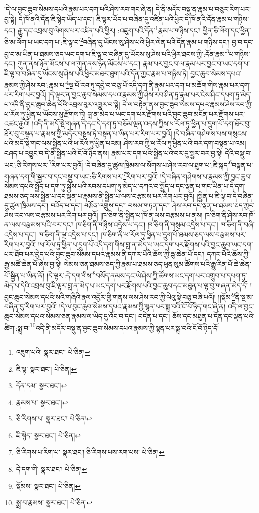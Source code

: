 །དེ་ལ་བྱང་ཆུབ་སེམས་དཔའི་རྣམ་པར་དག་པའི་ཤེས་རབ་གང་ཞེ་ན། དེ་ནི་མདོར་བསྡུ་ན་རྣམ་པ་བཅུར་རིག་པར་བྱ་སྟེ། དེ་ཁོ་ནའི་དོན་ཇི་སྙེད་ཡོད་པ་དང་། ཇི་ལྟར་ཡོད་པ་བཞིན་དུ་འཛིན་པའི་ཕྱིར་དེ་ཁོ་ནའི་དོན་རྣམ་པ་གཉིས་དང་། རྒྱུ་དང་འབྲས་བུ་ལེགས་པར་འཛིན་པའི་ཕྱིར། :འཇུག་པའི་དོན་\footnote{འཇུག་པའི་  སྣར་ཐང་།  པེ་ཅིན། }རྣམ་པ་གཉིས་དང་། ཕྱིན་ཅི་ལོག་དང་ཕྱིན་ཅི་མ་ལོག་པ་ཡང་དག་པ་:ཇི་ལྟ་བ་\footnote{ཇི་ལྟ་  སྣར་ཐང་།  པེ་ཅིན། }བཞིན་དུ་ཡོངས་སུ་ཤེས་པའི་ཕྱིར་ལེན་པའི་དོན་རྣམ་པ་གཉིས་དང་། བྱ་བ་དང་བྱ་བ་མ་ཡིན་པ་ཐམས་ཅད་ཡང་དག་པ་ཇི་ལྟ་བ་བཞིན་དུ་ཡོངས་སུ་ཤེས་པའི་ཕྱིར་ཐབས་ཀྱི་:དོན་རྣམ་\footnote{དོན་དམ་  སྣར་ཐང་། }པ་གཉིས་དང་། ཀུན་ནས་ཉོན་མོངས་པ་ལ་ཀུན་ནས་ཉོན་མོངས་པ་དང་། རྣམ་པར་བྱང་བ་ལ་རྣམ་པར་བྱང་བ་ཡང་དག་པ་ཇི་ལྟ་བ་བཞིན་དུ་ཡོངས་སུ་ཤེས་པའི་ཕྱིར་མཐར་ཐུག་པའི་དོན་ཀྱང་རྣམ་པ་གཉིས་ཏེ། བྱང་ཆུབ་སེམས་དཔའ་རྣམས་ཀྱི་ཤེས་རབ་:རྣམ་པ་\footnote{རྣམས་པ་  སྣར་ཐང་། }ལྔ་པོ་རབ་ཏུ་དབྱེ་བ་བཅུ་པོ་འདི་དག་ནི་རྣམ་པར་དག་པ་མཆོག་གིས་རྣམ་པར་དག་པར་རིག་པར་བྱའོ། །དེ་ལྟར་ན་བྱང་ཆུབ་སེམས་དཔའ་རྣམས་ཀྱི་ཤེས་རབ་ཤིན་ཏུ་རྣམ་པར་ངེས་ཤིང་དཔག་ཏུ་མེད་པ་འདི་ནི་བྱང་ཆུབ་ཆེན་པོའི་འབྲས་བུར་འགྱུར་བ་སྟེ། དེ་ལ་བརྟེན་ནས་བྱང་ཆུབ་སེམས་དཔའ་རྣམས་ཤེས་རབ་ཀྱི་ཕ་རོལ་ཏུ་ཕྱིན་པ་ཡོངས་སུ་རྫོགས་ཏེ། བླ་ན་མེད་པ་ཡང་དག་པར་རྫོགས་པའི་བྱང་ཆུབ་མངོན་པར་རྫོགས་པར་འཚང་རྒྱའོ། །འདི་ནི་མདོ་སྡེ་གཞན་དེ་དང་དེ་དག་ཏུ་བཅོམ་ལྡན་འདས་ཀྱིས་ཕ་རོལ་ཏུ་ཕྱིན་པ་དྲུག་པོ་དག་ཐོར་བུ་ཐོར་བུ་བསྟན་པ་རྣམས་ཀྱི་མདོར་བསྡུས་ཏེ་བསྟན་པ་ཡིན་པར་རིག་པར་བྱའོ། །དེ་བཞིན་གཤེགས་པས་གསུངས་པའི་མདོ་སྡེ་གང་ལས་སྦྱིན་པའི་ཕ་རོལ་ཏུ་ཕྱིན་པའམ། ཤེས་རབ་ཀྱི་ཕ་རོལ་ཏུ་ཕྱིན་པའི་བར་དག་བསྟན་པ་འམ། བཤད་པ་འབྱུང་བ་དེ་ནི་སྦྱིན་པའི་ངོ་བོ་ཉིད་ནས། རྣམ་པར་དག་པའི་སྦྱིན་པའི་བར་དུ་སྦྱར་བར་བྱ་སྟེ། དེའི་བསྡུ་བ་ཡང་:ཅི་རིགས་པར་\footnote{ཅི་རིགས་པ་  སྣར་ཐང་།  པེ་ཅིན། }རིག་པར་བྱའོ། །དེ་བཞིན་དུ་ཚུལ་ཁྲིམས་ལ་སོགས་པ་ཤེས་རབ་ལ་ཐུག་པ་:ཇི་སྐད་\footnote{ཇི་སྙེད་  སྣར་ཐང་།  པེ་ཅིན། }བསྟན་པ་གཞན་དག་གི་སྦྱར་བ་དང་བསྡུ་བ་ཡང་:ཅི་རིགས་པར་\footnote{ཅི་རིགས་པ་རིག་པ་  སྣར་ཐང་། ཅི་རིགས་པས་རག་པས་  པེ་ཅིན། }རིག་པར་བྱའོ། །དེ་བཞིན་གཤེགས་པ་རྣམས་ཀྱི་བྱང་ཆུབ་སེམས་དཔའི་སྤྱོད་པ་དག་ཏུ་སྐྱེས་པའི་རབས་དཔག་ཏུ་མེད་པ་དཀའ་བ་སྤྱོད་པ་དང་ལྡན་པ་གང་ཡིན་པ་དེ་དག་ཐམས་ཅད་ལས་སྦྱིན་པ་དང་ལྡན་པ་རྣམས་ནི་སྦྱིན་པ་ལས་བརྩམས་པར་རིག་པར་བྱའོ། །སྦྱིན་པ་ཇི་ལྟ་བ་དེ་བཞིན་དུ་ཚུལ་ཁྲིམས་དང་། བཟོད་པ་དང་། བརྩོན་འགྲུས་དང་། བསམ་གཏན་དང་། ཤེས་རབ་དང་ལྡན་པ་ཐམས་ཅད་ཀྱང་ཤེས་རབ་ལས་བརྩམས་པར་རིག་པར་བྱའོ། །ཁ་ཅིག་ནི་སྦྱིན་པ་ཁོ་ན་ལས་བརྩམས་པ་ནས། ཁ་ཅིག་ནི་ཤེས་རབ་ཁོ་ན་ལས་བརྩམས་པའི་བར་དང་། ཁ་ཅིག་ནི་གཉིས་འདྲེས་པ་དང་། ཁ་ཅིག་ནི་གསུམ་འདྲེས་པ་དང་། ཁ་ཅིག་ནི་བཞི་འདྲེས་པ་དང་། ཁ་ཅིག་ནི་ལྔ་འདྲེས་པ་དང་། ཁ་ཅིག་ནི་ཕ་རོལ་ཏུ་ཕྱིན་པ་དྲུག་པོ་ཐམས་ཅད་ལས་བརྩམས་པར་རིག་པར་བྱའོ། །ཕ་རོལ་ཏུ་ཕྱིན་པ་དྲུག་པོ་འདི་དག་གིས་བླ་ན་མེད་པ་ཡང་དག་པར་རྫོགས་པའི་བྱང་ཆུབ་ཡང་དག་པར་ཐོབ་པར་བྱེད་པའི་བྱང་ཆུབ་སེམས་དཔའ་རྣམས་ནི་དཀར་པོའི་ཆོས་ཀྱི་ཆུ་ཆེན་པོ་དང་། དཀར་པོའི་ཆོས་ཀྱི་རྒྱ་མཚོ་ཆེན་པོ་ཞེས་བྱ་སྟེ། སེམས་ཅན་ཐམས་ཅད་ཀྱི་རྣམ་པ་ཐམས་ཅད་ཕུན་སུམ་ཚོགས་པའི་རྒྱུ་རིན་པོ་ཆེ་ཆེན་པོ་སྦྱིན་པ་ཡིན་ནོ། །དེ་ལྟར་:དེ་དག་གིས་\footnote{དེ་དག་གི་  སྣར་ཐང་།  པེ་ཅིན། }བསོད་ནམས་དང་ཡེ་ཤེས་ཀྱི་ཚོགས་ཡང་དག་པར་འགྲུབ་པ་དཔག་ཏུ་མེད་པ་དེའི་འབྲས་བུ་ཇི་ལྟར་བླ་ན་མེད་པ་ཡང་དག་པར་རྫོགས་པའི་བྱང་ཆུབ་དང་མཐུན་པ་ལྟ་བུ་གཞན་མེད་དོ། །བྱང་ཆུབ་སེམས་དཔའི་སའི་གཞིའི་རྣལ་འབྱོར་གྱི་གནས་ལས་ཤེས་རབ་ཀྱི་ལེའུ་སྟེ་བཅུ་བཞི་པའོ།། །།སྡོམ་\footnote{སྡོམས་  སྣར་ཐང་།  པེ་ཅིན། }ནི་སྔ་མ་བཞིན་དུ་རིག་པར་བྱའོ། །དེ་ལ་བྱང་ཆུབ་སེམས་དཔའ་རྣམས་ཀྱི་སྙན་པར་སྨྲ་བའི་ངོ་བོ་ཉིད་གང་ཞེ་ན། འདི་ལ་བྱང་ཆུབ་སེམས་དཔའ་སེམས་ཅན་རྣམས་ལ་ཡིད་དུ་འོང་བ་དང་། བདེན་པ་དང་། ཆོས་དང་མཐུན་པ་དོན་དང་ལྡན་པའི་ཚིག་:སྨྲ་བ་\footnote{སྨྲ་བ་རྣམས་  སྣར་ཐང་།  པེ་ཅིན། }འདི་ནི་མདོར་བསྡུ་ན་བྱང་ཆུབ་སེམས་དཔའ་རྣམས་ཀྱི་སྙན་པར་སྨྲ་བའི་ངོ་བོ་ཉིད་དོ། 